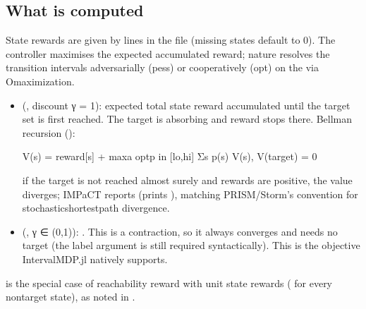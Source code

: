 \documentclass[a4paper,10pt,english]{sphinxmanual}
\begin{document}
\subsection{What is computed}
\label{\detokenize{manual/rewards:what-is-computed}}
\sphinxAtStartPar
State rewards are given by  lines in the  file (missing states
default to 0). The controller maximises the expected accumulated reward; nature
resolves the transition intervals adversarially (pess) or cooperatively (opt) on the
 via O\sphinxhyphen{}maximization.
\begin{itemize}
\item {} 
\sphinxAtStartPar
{} (, discount γ = 1): expected total state reward
accumulated until the target set is first reached. The target is absorbing and
reward stops there. Bellman recursion ():

\begin{sphinxVerbatim}[commandchars=\\\{\}]
V(s) = reward[s] + max\PYGZus{}a  opt\PYGZus{}\PYGZob{}p in [lo,hi]\PYGZcb{} Σ\PYGZus{}s\PYGZsq{} p(s\PYGZsq{}) V(s\PYGZsq{}),    V(target) = 0
\end{sphinxVerbatim}

\sphinxAtStartPar
{} if the target is not reached almost surely and rewards are
positive, the value diverges; IMPaCT reports  (prints ), matching
PRISM/Storm’s  convention for stochastic\sphinxhyphen{}shortest\sphinxhyphen{}path divergence.

\item {} 
\sphinxAtStartPar
{} (, γ ∈ (0,1)):
. This is a contraction, so it always
converges and needs no target (the label argument is still required syntactically).
This is the objective IntervalMDP.jl natively supports.

\end{itemize}

\sphinxAtStartPar
{} is the special case of reachability reward
with unit state rewards ( for every non\sphinxhyphen{}target state), as noted in
.
\end{document}
